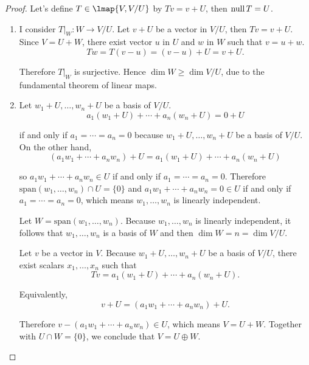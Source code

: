 \begin{proof}
    Let's define $T\in\lmap{V, V/U}$ by $Tv = v + U$, then $\text{null}\,{T} = U$.

    \begin{enumerate}[label={(\alph*)}]
        \item I consider $T\vert_{W}: W\to V/U$. Let $v + U$ be a vector in $V/U$, then $Tv = v + U$. Since $V = U + W$, there exist vector $u$ in $U$ and $w$ in $W$ such that $v = u + w$.
              \[
                  Tw = T(v - u) = (v - u) + U = v + U.
              \]

              Therefore $T\vert_{W}$ is surjective. Hence $\dim W\geq \dim V/U$, due to the fundamental theorem of linear maps.
        \item Let $w_{1} + U, \ldots, w_{n} + U$ be a basis of $V/U$.
              \[
                  a_{1}(w_{1} + U) + \cdots + a_{n}(w_{n} + U) = 0 + U
              \]

              if and only if $a_{1} = \cdots = a_{n} = 0$ because $w_{1} + U, \ldots, w_{n} + U$ be a basis of $V/U$. On the other hand,
              \[
                  (a_{1}w_{1} + \cdots + a_{n}w_{n}) + U = a_{1}(w_{1} + U) + \cdots + a_{n}(w_{n} + U)
              \]

              so $a_{1}w_{1} + \cdots + a_{n}w_{n}\in U$ if and only if $a_{1} = \cdots = a_{n} = 0$. Therefore $\text{span}(w_{1}, \ldots, w_{n})\cap U = \{ 0 \}$  and $a_{1}w_{1} + \cdots + a_{n}w_{n} = 0\in U$ if and only if $a_{1} = \cdots = a_{n} = 0$, which means $w_{1}, \ldots, w_{n}$ is linearly independent.

              Let $W = \text{span}(w_{1}, \ldots, w_{n})$. Because $w_{1}, \ldots, w_{n}$ is linearly independent, it follows that $w_{1}, \ldots, w_{n}$ is a basis of $W$ and then $\dim W = n = \dim V/U$.

              Let $v$ be a vector in $V$. Because $w_{1} + U, \ldots, w_{n} + U$ be a basis of $V/U$, there exist scalars $x_{1}, \ldots, x_{n}$ such that
              \[
                  Tv = a_{1}(w_{1} + U) + \cdots + a_{n}(w_{n} + U).
              \]

              Equivalently,
              \[
                  v + U = (a_{1}w_{1} + \cdots + a_{n}w_{n}) + U.
              \]

              Therefore $v - (a_{1}w_{1} + \cdots + a_{n}w_{n})\in U$, which means $V = U + W$. Together with $U\cap W = \{0\}$, we conclude that $V = U\oplus W$.
    \end{enumerate}
\end{proof}
\newpage

